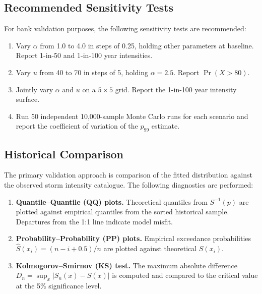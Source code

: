 \documentclass[11pt,a4paper]{article}
\begin{document}
\subsection{Recommended Sensitivity Tests}

For bank validation purposes, the following sensitivity tests are recommended:
\begin{enumerate}[nosep]
    \item Vary $\alpha$ from 1.0 to 4.0 in steps of 0.25, holding other parameters
          at baseline. Report 1-in-50 and 1-in-100 year intensities.
    \item Vary $u$ from 40 to 70 in steps of 5, holding $\alpha = 2.5$. Report
          $\Pr(X > 80)$.
    \item Jointly vary $\alpha$ and $u$ on a $5 \times 5$ grid. Report the
          1-in-100 year intensity surface.
    \item Run 50 independent 10{,}000-sample Monte Carlo runs for each scenario
          and report the coefficient of variation of the $p_{99}$ estimate.
\end{enumerate}

\mkmvalidation

\subsection{Historical Comparison}

The primary validation approach is comparison of the fitted distribution against
the observed storm intensity catalogue. The following diagnostics are performed:

\begin{enumerate}[nosep]
    \item \textbf{Quantile--Quantile (QQ) plots.} Theoretical quantiles from
          $S^{-1}(p)$ are plotted against empirical quantiles from the sorted
          historical sample. Departures from the 1:1 line indicate model misfit.
    \item \textbf{Probability--Probability (PP) plots.} Empirical exceedance
          probabilities $\hat{S}(x_i) = (n - i + 0.5)/n$ are plotted against
          theoretical $S(x_i)$.
    \item \textbf{Kolmogorov--Smirnov (KS) test.} The maximum absolute difference
          $D_n = \sup_x |S_n(x) - S(x)|$ is computed and compared to the critical
          value at the 5\% significance level.
\end{enumerate}
\end{document}
